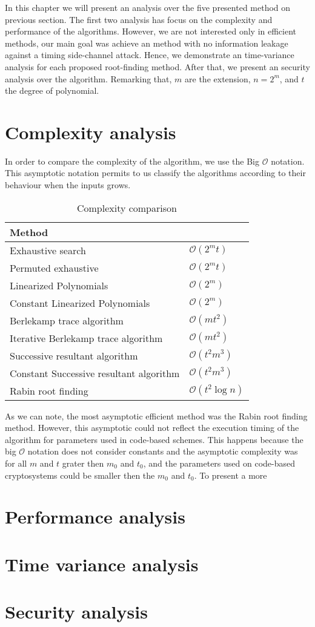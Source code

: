In this chapter we will present an analysis over the five presented method on previous section. The first two analysis has focus on the complexity and performance of the algorithms. However, we are not interested only in efficient methods, our main goal was achieve an method with no information leakage against a timing side-channel attack. Hence, we demonstrate an time-variance analysis for each proposed root-finding method. After that, we present an security analysis over the algorithm. Remarking that, $m$ are the extension, $n = 2^m$, and $t$ the degree of polynomial.

\section{Complexity analysis}
In order to compare the complexity of the algorithm, we use the Big $\mathcal{O}$ notation. This asymptotic notation permits to us classify the algorithms according to their behaviour when the inputs grows. 




\begin{table}[ht]
\centering
\label{tab:complexity}
\caption{Complexity comparison}
\begin{tabular}{ll}
Method                                  &                \\ \hline
Exhaustive search                       & $\mathcal{O}(2^mt)$ \\
Permuted exhaustive                     & $\mathcal{O}(2^mt)$ \\
Linearized Polynomials                  & $\mathcal{O}(2^m)$ \\
Constant Linearized Polynomials         & $\mathcal{O}(2^m)$ \\
Berlekamp trace algorithm               & $\mathcal{O}(mt^2)$ \\
Iterative Berlekamp trace algorithm     & $\mathcal{O}(mt^2)$ \\
Successive resultant algorithm          & $\mathcal{O}(t^2m^3)$ \\
Constant Successive resultant algorithm & $\mathcal{O}(t^2m^3)$ \\
Rabin root finding                      & $\mathcal{O}(t^2 \log{n})$
\end{tabular}
\end{table}

As we can note, the most asymptotic efficient method was the Rabin root finding method. However, this asymptotic could not reflect the execution timing of the algorithm for parameters used in code-based schemes. This happens because the big $\mathcal{O}$ notation does not consider constants and the asymptotic complexity was for all $m$ and $t$ grater then $m_0$ and $t_0$, and the parameters used on code-based cryptosystems could be smaller then the $m_0$ and $t_0$. To present a more 

\section{Performance analysis}
\section{Time variance analysis}
\section{Security analysis}